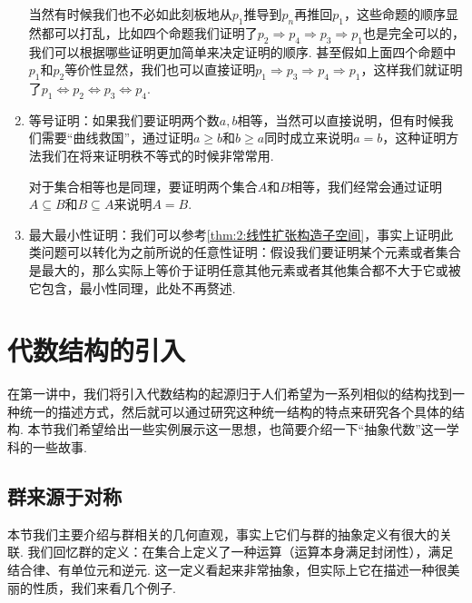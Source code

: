 \begin{enumerate}
    当然有时候我们也不必如此刻板地从$p_1$推导到$p_n$再推回$p_1$，这些命题的顺序显然都可以打乱，比如四个命题我们证明了$p_2\Rightarrow p_4\Rightarrow p_3\Rightarrow p_1$也是完全可以的，我们可以根据哪些证明更加简单来决定证明的顺序. 甚至假如上面四个命题中$p_1$和$p_2$等价性显然，我们也可以直接证明$p_1\Rightarrow p_3\Rightarrow p_4\Rightarrow p_1$，这样我们就证明了$p_1\iff p_2\iff p_3\iff p_4$.

    \item 等号证明：如果我们要证明两个数$a,b$相等，当然可以直接说明，但有时候我们需要``曲线救国''，通过证明$a\geqslant b$和$b\geqslant a$同时成立来说明$a=b$，这种证明方法我们在将来证明秩不等式的时候非常常用.

    对于集合相等也是同理，要证明两个集合$A$和$B$相等，我们经常会通过证明$A\subseteq B$和$B\subseteq A$来说明$A=B$.

    \item 最大最小性证明：我们可以参考\autoref{thm:2:线性扩张构造子空间}，事实上证明此类问题可以转化为之前所说的任意性证明：假设我们要证明某个元素或者集合是最大的，那么实际上等价于证明任意其他元素或者其他集合都不大于它或被它包含，最小性同理，此处不再赘述.
\end{enumerate}

\section*{代数结构的引入}

在第一讲中，我们将引入代数结构的起源归于人们希望为一系列相似的结构找到一种统一的描述方式，然后就可以通过研究这种统一结构的特点来研究各个具体的结构. 本节我们希望给出一些实例展示这一思想，也简要介绍一下``抽象代数''这一学科的一些故事.

\subsection*{群来源于对称}
本节我们主要介绍与群相关的几何直观，事实上它们与群的抽象定义有很大的关联. 我们回忆群的定义：在集合上定义了一种运算（运算本身满足封闭性），满足结合律、有单位元和逆元. 这一定义看起来非常抽象，但实际上它在描述一种很美丽的性质，我们来看几个例子.

